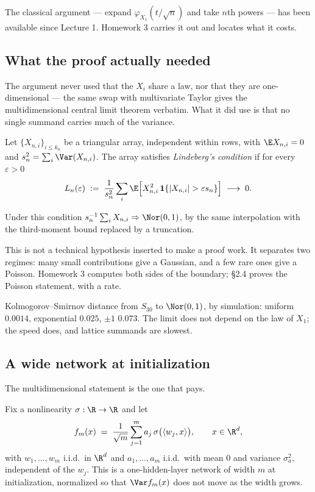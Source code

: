 \documentclass[11pt]{article}
\begin{document}
The classical argument --- expand $\varphi_{X_1}(t/\sqrt n)$ and take $n$th powers --- has been available since Lecture 1. Homework 3 carries it out and locates what it costs.

\subsection{What the proof actually needed}

The argument never used that the $X_i$ share a law, nor that they are one-dimensional --- the same swap with multivariate Taylor gives the multidimensional central limit theorem verbatim. What it did use is that no single summand carries much of the variance.

\begin{definition}\label{def:lind}
Let $\{X_{n,i}\}_{i\le k_n}$ be a triangular array, independent within rows, with $\E X_{n,i}=0$ and $s_n^2=\sum_i\Var(X_{n,i})$. The array satisfies \emph{Lindeberg's condition} if for every $\varepsilon>0$
\[
L_n(\varepsilon)\;:=\;\frac{1}{s_n^2}\sum_i\E\Big[X_{n,i}^2\,\mathbf 1\{|X_{n,i}|>\varepsilon s_n\}\Big]\;\longrightarrow\;0 .
\]
\end{definition}

Under this condition $s_n^{-1}\sum_i X_{n,i}\Rightarrow\Nor(0,1)$, by the same interpolation with the third-moment bound replaced by a truncation.

This is not a technical hypothesis inserted to make a proof work. It separates two regimes: many small contributions give a Gaussian, and a few rare ones give a Poisson. Homework 3 computes both sides of the boundary; \S2.4 proves the Poisson statement, with a rate.

\begin{remark}
Kolmogorov--Smirnov distance from $S_{30}$ to $\Nor(0,1)$, by simulation: uniform $0.0014$, exponential $0.025$, $\pm1$ $0.073$. The limit does not depend on the law of $X_1$; the speed does, and lattice summands are slowest.
\end{remark}

\subsection{A wide network at initialization}

The multidimensional statement is the one that pays.

Fix a nonlinearity $\sigma:\R\to\R$ and let
\[
f_m(x)\;=\;\frac{1}{\sqrt m}\sum_{j=1}^{m}a_j\,\sigma\big(\langle w_j,x\rangle\big),\qquad x\in\R^d,
\]
with $w_1,\dots,w_m$ i.i.d.\ in $\R^d$ and $a_1,\dots,a_m$ i.i.d.\ with mean $0$ and variance $\sigma_a^2$, independent of the $w_j$. This is a one-hidden-layer network of width $m$ at initialization, normalized so that $\Var f_m(x)$ does not move as the width grows.
\end{document}
